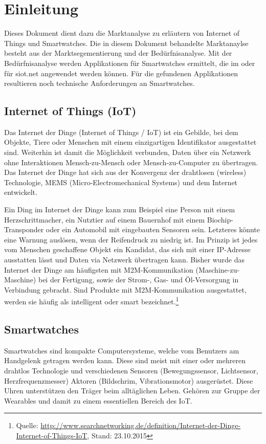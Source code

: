 \chapter{Einleitung}
Dieses Dokument dient dazu die Marktanalyse zu erläutern von Internet of Things und Smartwatches.
Die in diesem Dokument behandelte Marktanaylse besteht aus der Marktsegementierung und der Bedürfnisanalyse.
Mit der Bedürfnisanalyse werden Applikationen für Smartwatches ermittelt, die im oder für siot.net angewendet werden können.
Für die gefundenen Applikationen resultieren noch technische Anforderungen an Smartwatches.

\section{Internet of Things (IoT)}
Das Internet der Dinge (Internet of Things / IoT) ist ein Gebilde, bei dem Objekte, Tiere oder Menschen mit einem einzigartigen Identifikator ausgestattet sind. Weiterhin ist damit die Möglichkeit verbunden, Daten über ein Netzwerk ohne Interaktionen Mensch-zu-Mensch oder Mensch-zu-Computer zu übertragen. Das Internet der Dinge hat sich aus der Konvergenz der drahtlosen (wireless) Technologie, MEMS (Micro-Electromechanical Systems) und dem Internet entwickelt.

Ein Ding im Internet der Dinge kann zum Beispiel eine Person mit einem Herzschrittmacher, ein Nutztier auf einem Bauernhof mit einem Biochip-Transponder oder ein Automobil mit eingebauten Sensoren sein. Letzteres könnte eine Warnung auslösen, wenn der Reifendruck zu niedrig ist. Im Prinzip ist jedes vom Menschen geschaffene Objekt ein Kandidat, das sich mit einer IP-Adresse ausstatten lässt und Daten via Netzwerk übertragen kann. Bisher wurde das Internet der Dinge am häufigsten mit M2M-Kommunikation (Maschine-zu-Maschine) bei der Fertigung, sowie der Strom-, Gas- und Öl-Versorgung in Verbindung gebracht. Sind Produkte mit M2M-Kommunikation ausgestattet, werden sie häufig als intelligent oder smart bezeichnet.\footnote{Quelle: \url{http://www.searchnetworking.de/definition/Internet-der-Dinge-Internet-of-Things-IoT}, Stand: 23.10.2015}


\section{Smartwatches}
Smartwatches sind kompakte Computersysteme, welche vom Benutzers am Handgelenk getragen werden kann. Diese sind meist mit einer oder mehreren drahtlos Technologie und verschiedenen Sensoren (Bewegungssensor, Lichtsensor, Herzfrequenzmesser) Aktoren (Bildschrim, Vibrationsmotor) ausgerüstet.
Diese Uhren unterstützen den Träger beim alltäglichen Leben. Gehören zur Gruppe der Wearables und damit zu einem essentiellen Bereich des IoT.

